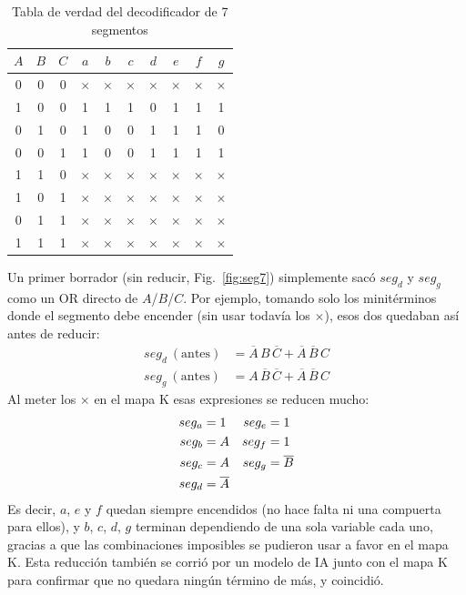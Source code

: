 \documentclass[10pt,conference]{IEEEtran}
\begin{document}
	\begin{table}[H]
		\centering
		\caption{Tabla de verdad del decodificador de 7 segmentos}
		\label{tab:seg}
		\begin{tabular}{ccc|ccccccc}
			\toprule
			$A$ & $B$ & $C$ & $a$ & $b$ & $c$ & $d$ & $e$ & $f$ & $g$\\
			\midrule
			0&0&0 & $\times$&$\times$&$\times$&$\times$&$\times$&$\times$&$\times$\\
			1&0&0 & 1&1&1&0&1&1&1\\
			0&1&0 & 1&0&0&1&1&1&0\\
			0&0&1 & 1&0&0&1&1&1&1\\
			1&1&0 & $\times$&$\times$&$\times$&$\times$&$\times$&$\times$&$\times$\\
			1&0&1 & $\times$&$\times$&$\times$&$\times$&$\times$&$\times$&$\times$\\
			0&1&1 & $\times$&$\times$&$\times$&$\times$&$\times$&$\times$&$\times$\\
			1&1&1 & $\times$&$\times$&$\times$&$\times$&$\times$&$\times$&$\times$\\
			\bottomrule
		\end{tabular}
	\end{table}
	
	Un primer borrador (sin reducir, Fig.~\ref{fig:seg7}) simplemente sac\'o $seg_d$ y $seg_g$ como un
	OR directo de $A$/$B$/$C$. Por ejemplo, tomando solo los minit\'erminos donde el segmento debe
	encender (sin usar todav\'ia los $\times$), esos dos quedaban as\'i antes de reducir:
	\begin{align}
		seg_d\ (\text{antes}) &= \overline{A}\,B\,\overline{C} + \overline{A}\,\overline{B}\,C\\
		seg_g\ (\text{antes}) &= A\,\overline{B}\,\overline{C} + \overline{A}\,\overline{B}\,C
	\end{align}
	Al meter los $\times$ en el mapa K esas expresiones se reducen mucho:
	\begin{align}
		seg_a &= 1 & seg_e &= 1\notag\\
		seg_b &= A & seg_f &= 1\notag\\
		seg_c &= A & seg_g &= \overline{B}\notag\\
		seg_d &= \overline{A} & &
	\end{align}
	Es decir, $a$, $e$ y $f$ quedan siempre encendidos (no hace falta ni una compuerta para ellos), y
	$b$, $c$, $d$, $g$ terminan dependiendo de una sola variable cada uno, gracias a que las
	combinaciones imposibles se pudieron usar a favor en el mapa K. Esta reducci\'on tambi\'en se
	corri\'o por un modelo de IA junto con el mapa K para confirmar que no quedara ning\'un t\'ermino
	de m\'as, y coincidi\'o.
	
\end{document}
